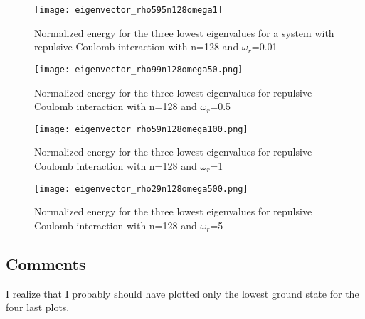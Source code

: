 \FloatBarrier
\begin{figure}[!ht]
\centering
\FloatBarrier
\texttt{[image: eigenvector\_rho595n128omega1]}

\caption{Normalized energy for the three lowest eigenvalues for a system with repulsive Coulomb interaction with n=128 and $\omega_r$=0.01}
\label{fig:Eigenvalue_states_n_128_omega_1}
\end{figure}
\FloatBarrier


\FloatBarrier
\begin{figure}[!ht]
\centering
\FloatBarrier
\texttt{[image: eigenvector\_rho99n128omega50.png]}

\caption{Normalized energy for the three lowest eigenvalues for repulsive Coulomb interaction with n=128 and $\omega_r$=0.5}
\label{fig:Eigenvalue_states_n_128_omega_50}
\end{figure}
\FloatBarrier


\FloatBarrier
\begin{figure}[!ht]
\centering
\FloatBarrier
\texttt{[image: eigenvector\_rho59n128omega100.png]}

\caption{Normalized energy for the three lowest eigenvalues for repulsive Coulomb interaction with n=128 and $\omega_r$=1}
\label{fig:Eigenvalue_states_n_320_omega_100}
\end{figure}
\FloatBarrier


\FloatBarrier
\begin{figure}[!ht]
\centering
\FloatBarrier
\texttt{[image: eigenvector\_rho29n128omega500.png]}

\caption{Normalized energy for the three lowest eigenvalues for repulsive Coulomb interaction with n=128 and $\omega_r$=5}
\label{fig:Eigenvalue_states_n_320_omega_500}
\end{figure}
\FloatBarrier


\subsection{Comments}
I realize that I probably should have plotted only the lowest ground state for the four last plots. 